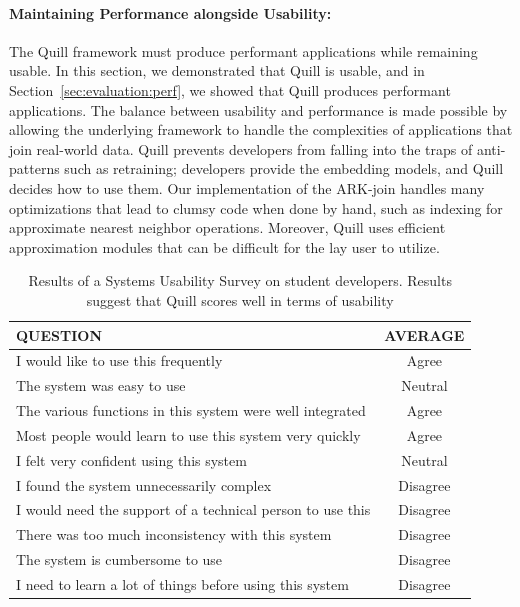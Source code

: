 \documentclass[11pt]{article}
\begin{document}
\paragraph{Maintaining Performance alongside Usability:}
The Quill framework must produce performant applications while remaining usable. In this section, we demonstrated that Quill is usable, and in Section~\ref{sec:evaluation:perf}, we showed that Quill produces performant applications. The balance between usability and performance is made possible by allowing the underlying framework to handle the complexities of applications that join real-world data. Quill prevents developers from falling into the traps of anti-patterns such as retraining; developers provide the embedding models, and Quill decides how to use them. Our implementation of the ARK-join handles many optimizations that lead to clumsy code when done by hand, such as indexing for approximate nearest neighbor operations. Moreover, Quill uses efficient approximation modules that can be difficult for the lay user to utilize.

\begin{table}[ht]
\begin{tabular}{|p{}|c|}
\hline
\textbf{QUESTION} & \textbf{AVERAGE} \\ \hline
I would like to use this frequently & Agree \\ \hline
The system was easy to use & Neutral \\ \hline
The various functions in this system were well integrated & Agree \\ \hline
Most people would learn to use this system very quickly & Agree \\ \hline
I felt very confident using this system & Neutral \\ \hline
I found the system unnecessarily complex & Disagree \\ \hline
I would need the support of a technical person to use this & Disagree \\ \hline
There was too much inconsistency with this system & Disagree \\ \hline
The system is cumbersome to use & Disagree \\ \hline
I need to learn a lot of things before using this system & Disagree \\ \hline
\bottomrule
\end{tabular}
\vspace{0.05cm}
\caption{Results of a Systems Usability Survey on student developers. Results suggest that Quill scores well in terms of usability}
\label{table:sus}
\end{table}
\end{document}

